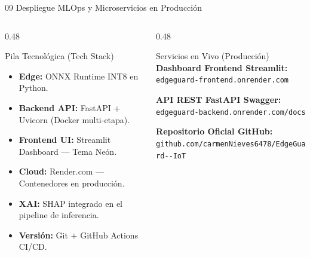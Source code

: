 \documentclass[aspectratio=169, 10pt]{beamer}
\begin{document}
\begin{frame}{09 \quad Despliegue MLOps y Microservicios en Producción}
  \begin{columns}[T]
    \begin{column}{0.48\textwidth}
      \begin{block}{Pila Tecnológica (Tech Stack)}
        \begin{itemize}\small
          \item \textbf{Edge:} ONNX Runtime INT8 en Python.
          \item \textbf{Backend API:} FastAPI + Uvicorn (Docker multi-etapa).
          \item \textbf{Frontend UI:} Streamlit Dashboard --- Tema Neón.
          \item \textbf{Cloud:} Render.com --- Contenedores en producción.
          \item \textbf{XAI:} SHAP integrado en el pipeline de inferencia.
          \item \textbf{Versión:} Git $+$ GitHub Actions CI/CD.
        \end{itemize}
      \end{block}
    \end{column}

    \begin{column}{0.48\textwidth}
      \begin{block}{Servicios en Vivo (Producción)}
        \small
        \textcolor{cyanneon}{\textbf{Dashboard Frontend Streamlit:}}\\
        \texttt{edgeguard-frontend.onrender.com}

        \vspace{6pt}
        \textcolor{cyanneon}{\textbf{API REST FastAPI Swagger:}}\\
        \texttt{edgeguard-backend.onrender.com/docs}

        \vspace{6pt}
        \textcolor{goldacc}{\textbf{Repositorio Oficial GitHub:}}\\
        \texttt{github.com/carmenNieves6478/EdgeGuard-{}-IoT}
      \end{block}
    \end{column}
  \end{columns}
\end{frame}
\end{document}
